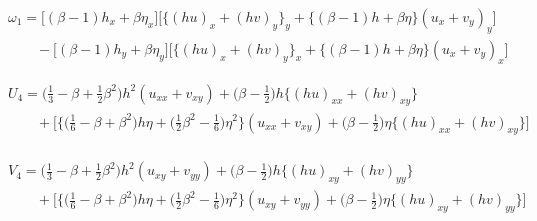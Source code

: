 \documentclass[11pt]{article}
\begin{document}
\begin{eqnarray}
&& \omega_1 = \bigg[ (\beta-1) h_x + \beta \eta_x \bigg]
           \bigg[ \Big\{ (hu)_x + (hv)_y \Big\}_y + \Big\{ (\beta-1)h + \beta \eta \Big\} (u_x+v_y)_y \bigg]   \nonumber  \\
&& \quad \quad
         - \bigg[ (\beta-1) h_y + \beta \eta_y \bigg]
           \bigg[ \Big\{ (hu)_x + (hv)_y \Big\}_x + \Big\{ (\beta-1)h + \beta \eta \Big\} (u_x+v_y)_x \bigg]
\end{eqnarray}

\begin{eqnarray}
&&U_4=\bigg( \frac{1}{3} - \beta + \frac{1}{2} \beta^2 \bigg) h^2 (u_{xx} + v_{xy})
      +
      \bigg( \beta - \frac{1}{2} \bigg) h \Big\{ (hu)_{xx} + (hv)_{xy} \Big\}
      \nonumber   \\
&& \quad \quad
      +
      \bigg[ \Big\{
      \Big(\frac{1}{6} - \beta + \beta^2 \Big) h \eta
      + \Big( \frac{1}{2} \beta^2 - \frac{1}{6} \Big) \eta^2
      \Big\} ( u_{xx}+v_{xy} )
      +
      \bigg( \beta - \frac{1}{2} \bigg) \eta
      \Big\{
      (hu)_{xx}+(hv)_{xy}
      \Big\}
      \bigg]   \nonumber \\
\end{eqnarray}

\begin{eqnarray}
&&V_4=\bigg( \frac{1}{3} - \beta + \frac{1}{2} \beta^2 \bigg) h^2 (u_{xy} + v_{yy})
      +
      \bigg( \beta - \frac{1}{2} \bigg) h \Big\{ (hu)_{xy} + (hv)_{yy} \Big\}
      \nonumber   \\
&& \quad \quad
      +
      \bigg[ \Big\{
      \Big(\frac{1}{6} - \beta + \beta^2 \Big) h \eta
      + \Big( \frac{1}{2} \beta^2 - \frac{1}{6} \Big) \eta^2
      \Big\} ( u_{xy}+v_{yy} )
      +
      \bigg( \beta - \frac{1}{2} \bigg) \eta
      \Big\{
      (hu)_{xy}+(hv)_{yy}
      \Big\}
      \bigg]   \nonumber \\
\end{eqnarray}
\end{document}
